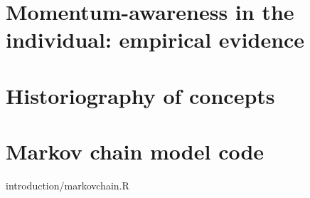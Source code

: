\documentclass[oneside]{book}
\newcommand{\includeR}[1]{#1}
\begin{document}
\chapter[Momentum-awareness in the individual]{Momentum-awareness in the individual: empirical evidence}
\label{ch:questionnaire}





%



\printindex

\appendix
\chapter{Historiography of concepts}
\label{app:concepts}
%

\chapter{Markov chain model code}
\label{app:markovmodel}
\includeR{introduction/markovchain.R}

%

%
\end{document}
